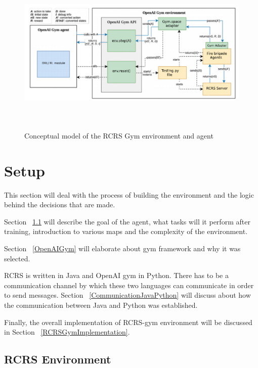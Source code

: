 \documentclass[12pt]{report}
\begin{document}
\begin{figure}[!h]
    \centering
    \includegraphics[height=8cm, width=17cm]{OpenAIgymRCRS.png}
    \caption{Conceptual model of the RCRS Gym environment and agent}
    \label{fig:OpenAIgymRCRS}
\end{figure}

\section{Setup} \label{Setup}

This section will deal with the process of building the environment and the logic behind the decisions that are made. 

Section ~\ref{RCRSEnvironment} will describe the goal of the agent, what tasks will it perform after training, introduction to various maps and the complexity of the environment. 

Section ~\ref{OpenAIGym} will elaborate about gym framework and why it was selected.

RCRS is written in Java and OpenAI gym in Python. There has to be a communication channel by which these two languages can communicate in order to send messages. Section ~\ref{CommunicationJavaPython} will discuss about how the communication between Java and Python was established. 

Finally, the overall implementation of RCRS-gym environment will be discussed in Section ~\ref{RCRSGymImplementation}. 


\subsection{RCRS Environment} \label{RCRSEnvironment}

\end{document}

